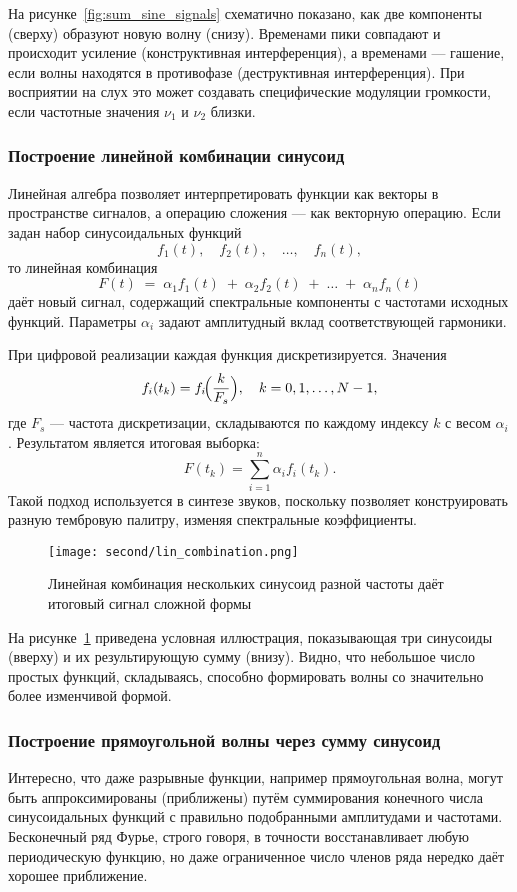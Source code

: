 \documentclass[bachelor, och, diploma]{SCWorks}
\begin{document}
На рисунке~\ref{fig:sum_sine_signals} схематично показано, как две компоненты (сверху) образуют новую волну (снизу). Временами пики совпадают и происходит усиление (конструктивная интерференция), а временами --- гашение, если волны находятся в противофазе (деструктивная интерференция). При восприятии на слух это может создавать специфические модуляции громкости, если частотные значения \(\nu_1\) и \(\nu_2\) близки.

\subsubsection{Построение линейной комбинации синусоид}
Линейная алгебра позволяет интерпретировать функции как векторы в пространстве сигналов, а операцию сложения --- как векторную операцию. Если задан набор синусоидальных функций
\[
f_1(t), \quad f_2(t), \quad \dots, \quad f_n(t),
\]
то линейная комбинация
\[
F(t) \;=\; \alpha_1 f_1(t) \;+\; \alpha_2 f_2(t) \;+\;\dots\;+\;\alpha_n f_n(t)
\]
даёт новый сигнал, содержащий спектральные компоненты с частотами исходных функций. Параметры \(\alpha_i\) задают амплитудный вклад соответствующей гармоники.

При цифровой реализации каждая функция дискретизируется. Значения
\[
f_i(t_k) = f_i\!\Bigl(\frac{k}{F_s}\Bigr), \quad k = 0,1,\dots,N-1,
\]
где \(F_s\) --- частота дискретизации, складываются по каждому индексу \(k\) с весом \(\alpha_i\). Результатом является итоговая выборка:
\[
F(t_k) = \sum_{i=1}^{n} \alpha_i f_i(t_k).
\]
Такой подход используется в синтезе звуков, поскольку позволяет конструировать разную тембровую палитру, изменяя спектральные коэффициенты.

\begin{figure}[h!]
\centering
\texttt{[image: second/lin\_combination.png]}
\caption{Линейная комбинация нескольких синусоид разной частоты даёт итоговый сигнал сложной формы}
\label{fig:lin_combination_sinus}
\end{figure}

На рисунке~\ref{fig:lin_combination_sinus} приведена условная иллюстрация, показывающая три синусоиды (вверху) и их результирующую сумму (внизу). Видно, что небольшое число простых функций, складываясь, способно формировать волны со значительно более изменчивой формой.

\subsubsection{Построение прямоугольной волны через сумму синусоид}
Интересно, что даже разрывные функции, например прямоугольная волна, могут быть аппроксимированы (приближены) путём суммирования конечного числа синусоидальных функций с правильно подобранными амплитудами и частотами. Бесконечный ряд Фурье, строго говоря, в точности восстанавливает любую периодическую функцию, но даже ограниченное число членов ряда нередко даёт хорошее приближение.
\end{document}
